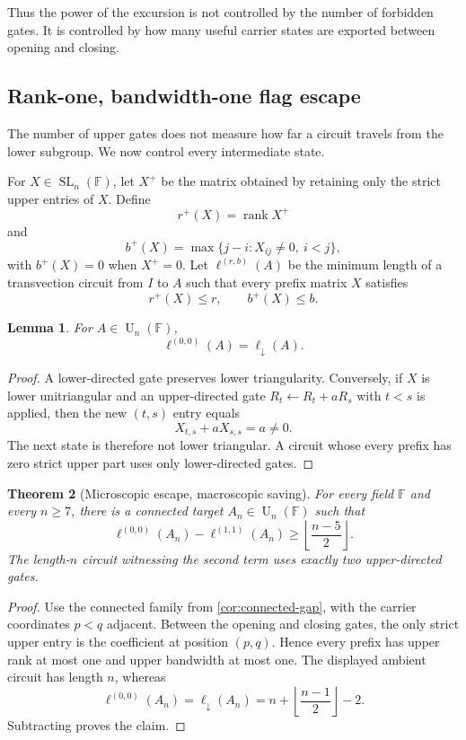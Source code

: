 \documentclass[11pt]{amsart}
\numberwithin{equation}{section}
\newtheorem{theorem}{Theorem}[section]
\newtheorem{lemma}[theorem]{Lemma}
\theoremstyle{definition}
\theoremstyle{remark}
\newcommand{\F}{\mathbb F}
\newcommand{\SL}{\operatorname{SL}}
\newcommand{\U}{\operatorname{U}}
\newcommand{\rank}{\operatorname{rank}}
\newcommand{\ellDown}{\ell_{\downarrow}}
\newcommand{\ellExc}[2]{\ell^{(#1,#2)}}
\begin{document}
Thus the power of the excursion is not controlled by the number of forbidden gates.  It is controlled by how many useful carrier states are exported between opening and closing.

\subsection{Rank-one, bandwidth-one flag escape}\label{subsec:microscopic-escape}

The number of upper gates does not measure how far a circuit travels from the lower subgroup.  We now control every intermediate state.

For $X\in\SL_n(\F)$, let $X^+$ be the matrix obtained by retaining only the strict upper entries of $X$.  Define
\[
r^+(X)=\rank X^+
\]
and
\[
b^+(X)=\max\{j-i:X_{ij}\ne0,\ i<j\},
\]
with $b^+(X)=0$ when $X^+=0$.  Let $\ellExc{r}{b}(A)$ be the minimum length of a transvection circuit from $I$ to $A$ such that every prefix matrix $X$ satisfies
\[
r^+(X)\le r,
\qquad
b^+(X)\le b.
\]

\begin{lemma}\label{lem:zero-excursion-equals-lower}
For $A\in\U_n(\F)$,
\[
\ellExc{0}{0}(A)=\ellDown(A).
\]
\end{lemma}

\begin{proof}
A lower-directed gate preserves lower triangularity.  Conversely, if $X$ is lower unitriangular and an upper-directed gate $R_t\leftarrow R_t+aR_s$ with $t<s$ is applied, then the new $(t,s)$ entry equals
\[
X_{t,s}+aX_{s,s}=a\ne0.
\]
The next state is therefore not lower triangular.  A circuit whose every prefix has zero strict upper part uses only lower-directed gates.
\end{proof}

\begin{theorem}[Microscopic escape, macroscopic saving]\label{thm:microscopic-escape}
For every field $\F$ and every $n\ge7$, there is a connected target $A_n\in\U_n(\F)$ such that
\[
\ellExc{0}{0}(A_n)-\ellExc{1}{1}(A_n)
\ge
\left\lfloor\frac{n-5}{2}\right\rfloor.
\]
The length-$n$ circuit witnessing the second term uses exactly two upper-directed gates.
\end{theorem}

\begin{proof}
Use the connected family from \cref{cor:connected-gap}, with the carrier coordinates $p<q$ adjacent.  Between the opening and closing gates, the only strict upper entry is the coefficient at position $(p,q)$.  Hence every prefix has upper rank at most one and upper bandwidth at most one.  The displayed ambient circuit has length $n$, whereas
\[
\ellExc{0}{0}(A_n)=\ellDown(A_n)
=n+\left\lfloor\frac{n-1}{2}\right\rfloor-2.
\]
Subtracting proves the claim.
\end{proof}
\end{document}
